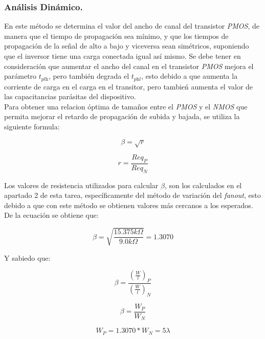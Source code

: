 \documentclass[12pt,a4paper]{article} %
\begin{document}
\subsubsection{Análisis Dinámico.}

En este método se determina  el valor del ancho de canal del transistor \textit{PMOS}, de manera que el tiempo de propagación sea mínimo, y que los tiempos de propagación de la señal de alto a bajo y viceversa sean simétricos, suponiendo que el inversor tiene una carga conectada igual así mismo. Se debe tener en consideración que aumentar el ancho del canal en el transistor \textit{PMOS} mejora el parámetro $\textit{t}_\textit{plh}$, pero también degrada el $\textit{t}_\textit{phl}$, esto debido a que aumenta la corriente de carga en el carga en el transitor, pero tambień aumenta el valor de las capacitancias parásitas del dispositivo.\\

Para obtener una relacion óptima de tamaños entre el \textit{PMOS} y el \textit{NMOS} que permita mejorar el retardo de propagación de subida y bajada, se utiliza la siguiente formula:

\begin{equation}\label{eqn:Beta}
\beta= \sqrt{r} 
\end{equation}

\begin{equation}\label{eqn:r}
r= \frac{Req_P}{Req_N}
\end{equation}
 
Los valores de resistencia utilizados para calcular $\beta$, son los calculados en el apartado 2 de esta tarea, específicamente del método de variación del \textit{fanout}, esto debido a que con este método se obtienen valores más cercanos a los esperados. De la ecuación  se obtiene que:

\begin{equation}\label{eqn:Beta2}
\beta= \sqrt{\frac{15.375k\Omega}{9.0k\Omega}} = 1.3070
\end{equation}

Y sabiedo que:

\begin{equation}\label{eqn:Beta3}
\beta= \frac{(\frac{W}{l})_P}{(\frac{W}{l})_N} 
\end{equation}

\begin{equation}\label{eqn:Beta4}
\beta= \frac{W_P}{W_N} 
\end{equation}

\begin{equation}\label{eqn:Beta5}
W_P= 1.3070*W_N = 5\lambda  
\end{equation}\\
\end{document}
